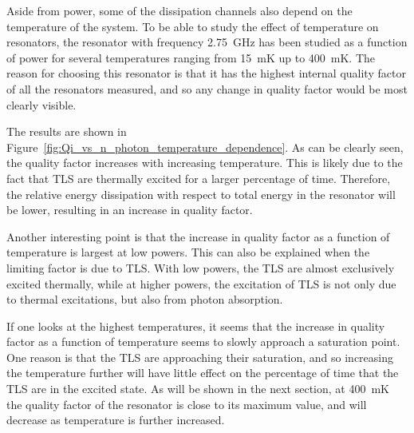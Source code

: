\documentclass[12pt]{report}
\begin{document}
Aside from power, some of the dissipation channels also depend on the temperature of the system. To be able to study the effect of temperature on resonators, the resonator with frequency \SI{2.75}{\giga \hertz} has been studied as a function of power for several temperatures ranging from \SI{15}{\milli \kelvin} up to \SI{400}{\milli \kelvin}. The reason for choosing this resonator is that it has the highest internal quality factor of all the resonators measured, and so any change in quality factor would be most clearly visible.

The results are shown in Figure~\ref{fig:Qi_vs_n_photon_temperature_dependence}. As can be clearly seen, the quality factor increases with increasing temperature. This is likely due to the fact that TLS are thermally excited for a larger percentage of time. Therefore, the relative energy dissipation with respect to total energy in the resonator will be lower, resulting in an increase in quality factor.

Another interesting point is that the increase in quality factor as a function of temperature is largest at low powers. This can also be explained when the limiting factor is due to TLS. With low powers, the TLS are almost exclusively excited thermally, while at higher powers, the excitation of TLS is not only due to thermal excitations, but also from photon absorption.

If one looks at the highest temperatures, it seems that the increase in quality factor as a function of temperature seems to slowly approach a saturation point. One reason is that the TLS are approaching their saturation, and so increasing the temperature further will have little effect on the percentage of time that the TLS are in the excited state. As will be shown in the next section, at \SI{400}{\milli \kelvin} the quality factor of the resonator is close to its maximum value, and will decrease as temperature is further increased.
\end{document}
